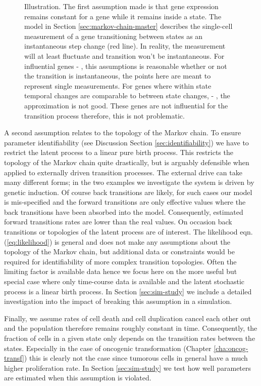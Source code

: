 \begin{figure}
{    Illustration. The first assumption made is that gene expression remains constant for a gene while it remains inside a state. The model in Section \ref{sec:markov-chain-master} describes the single-cell measurement of a gene transitioning between states as an instantaneous step change (red line). In reality, the measurement will at least fluctuate and transition won't be instantaneous. For influential genes  - , this assumptions is reasonable whether or not the transition is instantaneous, the points here are meant to represent single measurements. For genes where within state temporal changes are comparable to between state changes,  - , the approximation is not good. These genes are not influential for the transition process therefore, this is not problematic.
 }
  \label{fig:schematic-ass1}
\end{figure}

A second assumption relates to the topology of the Markov chain. To ensure parameter identifiability (see Discussion Section \ref{sec:identifiability}) we have to restrict the latent process to a linear pure birth process. This restricts the topology of the Markov chain quite drastically, but is arguably defensible when applied to externally driven transition processes. The external drive can take many different forms; in the two examples we investigate the system is driven by genetic induction. Of course back transitions are likely, for such cases our model is mis-specified and the forward transitions are only effective values where the back transitions have been absorbed into the model. Consequently, estimated forward transitions rates are lower than the real values. On occasion back transitions or topologies of the latent process are of interest.
The likelihood eqn. (\ref{eq:likelihood}) is general and does not make any assumptions about the topology of the Markov chain, but additional data or constraints would be required for identifiability of more complex transition topologies. Often the limiting factor is available data hence we focus here on the more useful but special case where only time-course data is available and the latent stochastic process is a linear birth process. In Section \ref{sec:sim-study} we include a detailed investigation into the impact of breaking this assumption in a simulation.

Finally, we assume rates of cell death and cell duplication cancel each other out and the population therefore remains roughly constant in time. Consequently, the fraction of cells in a given state only depends on the transition rates between the states. Especially in the case of oncogenic transformation (Chapter \ref{cha:oncog-transf}) this is clearly not the case since tumorous cells in general have a much higher proliferation rate. In Section \ref{sec:sim-study} we test how well parameters are estimated when this assumption is violated.

